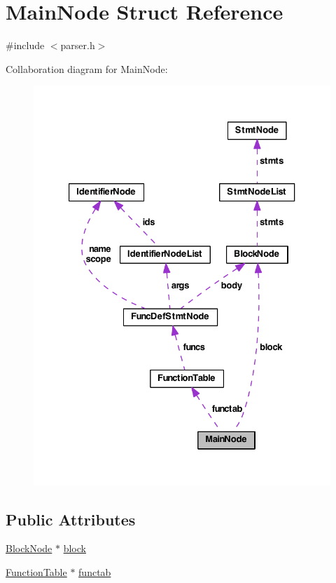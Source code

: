 \hypertarget{struct_main_node}{\section{Main\-Node Struct Reference}
\label{struct_main_node}
}


{\ttfamily \#include $<$parser.\-h$>$}



Collaboration diagram for Main\-Node\-:
\nopagebreak
\begin{figure}[H]
\begin{center}
\leavevmode
\includegraphics[width=329pt]{struct_main_node__coll__graph}
\end{center}
\end{figure}
\subsection*{Public Attributes}
\begin{DoxyCompactItemize}
\item 
\hyperlink{struct_block_node}{Block\-Node} $\ast$ \hyperlink{struct_main_node_aee302d107abb16c48702c2699a58d49f}{block}
\item 
\hyperlink{struct_function_table}{Function\-Table} $\ast$ \hyperlink{struct_main_node_a1b22e4833219bb71c9ca7f32d3e37241}{functab}
\end{DoxyCompactItemize}


